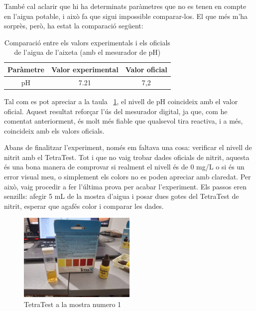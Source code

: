 També cal aclarir que hi ha determinats paràmetres que no es tenen en compte en l’aigua potable, i això fa que sigui impossible comparar-los. El que més m’ha sorprès, però, ha estat la comparació següent:
\begin{table}[h!]
\centering
\begin{tabular}{|c|c|c|}
\hline
\textbf{Paràmetre} & \textbf{Valor experimental} & \textbf{Valor oficial} \\
\hline \hline
pH & 7.21 & 7,2 \\
\hline
\end{tabular}
\caption{Comparació entre els valors experimentals i els oficials de l'aigua de l'aixeta (amb el mesurador de pH)}
\label{tab:comparacio_mesurador_ph1}
\end{table}

Tal com es pot apreciar a la taula~ \ref{tab:comparacio_mesurador_ph1}, el nivell de pH coincideix amb el valor oficial. Aquest resultat reforçar l'ús del mesurador digital, ja que, com he comentat anteriorment, és molt més fiable que qualsevol tira reactiva, i a més, coincideix amb els valors oficials.

Abans de finalitzar l’experiment, només em faltava una cosa: verificar el nivell de nitrit amb el TetraTest. Tot i que no vaig trobar dades oficials de nitrit, aquesta és una bona manera de comprovar si realment el nivell és de 0 mg/L o si és un error visual meu, o simplement els colors no es poden apreciar amb claredat. Per això, vaig procedir a fer l’última prova per acabar l’experiment. Els passos eren senzills: afegir 5 mL de la mostra d’aigua i posar dues gotes del TetraTest de nitrit, esperar que agafés color i comparar les dades.

\begin{figure}[H]
\centering
\includegraphics[width=0.5\textwidth]{./Figures/Tetra1.png}
\caption{TetraTest a la mostra numero 1}
\label{fig:TetraTestdeNitrit1}
\end{figure}

